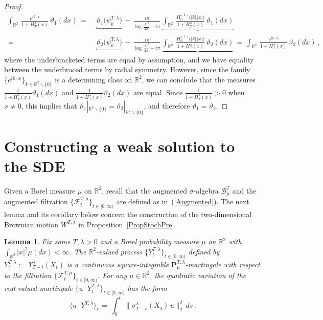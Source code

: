 \documentclass[10pt]{article}
\numberwithin{equation}{section}
\newtheorem{lemma}[theorem]{Lemma}
\theoremstyle{definition}
\newcommand{\R}{{\mathbb R}}
\newcommand{\Rphi}{{\Upsilon}}
\begin{document}
\begin{appendix}
\begin{proof}
\begin{align*}
\int_{\R^2}\, \frac{ e^{ik\cdot x}  }{  1+H_{T}^{\lambda}(x)   }\,\vartheta_1(dx)\,=\,&\,\underbracket{\vartheta_1\big( \psi^{T,\lambda}_{k} \big)}\,-\, \frac{  i\pi }{\log \frac{|k|^2}{2\lambda} -i\pi }\,\underbrace{\int_{\R^2}\, \frac{H_0^{(1)}\big(|k|\,|x|\big) }{  1+H_{T}^{\lambda}(x)   }\,\vartheta_1(dx)} \nonumber  \\
\,=\,&\,\underbracket{\vartheta_2\big( \psi^{T,\lambda}_{k} \big)}\,-\, \frac{  i\pi }{\log \frac{|k|^2}{2\lambda}-i\pi }\,\underbrace{\int_{\R^2} \,\frac{H_0^{(1)}\big(|k|\,|x|\big) }{  1+H_{T}^{\lambda}(x)   }\,\vartheta_2(dx)} 
\,=\,\int_{\R^2}\, \frac{ e^{ik\cdot x}  }{  1+H_{T}^{\lambda}(x)   }\,\vartheta_2(dx)\,,
\end{align*}
where the underbracketed terms are equal by assumption, and we have equality between the underbraced terms by radial symmetry. However, since the family $\{ e^{ik\cdot x}\}_{k\in \R^2\backslash\{0\} } $ is a determining class  on $\R^2$, we can conclude that the measures $ \frac{ 1  }{  1+H_{T}^{\lambda}(x)   }\vartheta_1(dx) $ and $ \frac{ 1 }{  1+H_{T}^{\lambda}(x)   }\vartheta_2(dx) $ are equal.  Since $\frac{ 1  }{  1+H_{T}^{\lambda}(x)   }>0 $ when $x\neq 0$, this implies that $\vartheta_1 |_{\R^2\backslash \{0\}}  = \vartheta_2 |_{\R^2\backslash \{0\}}  $,     and therefore   $\vartheta_1 =\vartheta_2$.
\end{proof}







\section{Constructing a weak solution to the SDE}\label{AppendixWeakSolConst}



Given a Borel measure $\mu$ on $\R^2$, recall that the augmented $\sigma$-algebra $\mathscr{B}^{T}_{\mu} $ and the augmented filtration $\{\mathscr{F}_t^{T,\mu} \}_{t\in [0,\infty)}$ are defined as in~(\ref{Augmented}). The next lemma and its corollary below concern the construction of the two-dimensional Brownian motion  $W^{T,\lambda }$ in Proposition~\ref{PropStochPre}. 
\begin{lemma}\label{LemmaMartI}  Fix some $T,\lambda >0$ and a Borel probability measure $\mu$ on $  \R^2$ with $\int_{\R^2}|x|^2\mu(dx)<\infty $.   The $\R^2$-valued process  $\{ Y_{t}^{T,\lambda} \}_{t\in [0,\infty)}$ defined by $Y_{t}^{T,\lambda}:=\Rphi_{T-t}^{\lambda}(X_t)$  is a continuous square-integrable   $\mathbf{P}^{T,\lambda}_{\mu}$-martingale with respect to the filtration $\{\mathscr{F}_t^{T,\mu}  \}_{t\in [0,\infty)}$.  For any $u\in \R^2$, the quadratic variation of the real-valued martingale $\{ u\cdot Y_{t}^{T,\lambda} \}_{t\in [0,\infty)}$ has the form 
$$  \big\langle u\cdot Y^{T,\lambda} \big\rangle_t \,=\, \int_0^t\, \big\|\sigma_{T-s}^{\lambda}(X_s) \,u\big\|_2^2   \,  ds \,. $$
\end{lemma}



\end{appendix}
\end{document}
